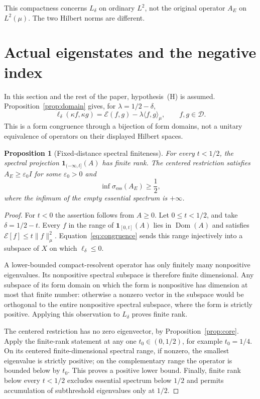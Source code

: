 \documentclass[11pt,a4paper]{article}
\numberwithin{equation}{section}
\newtheorem{proposition}[theorem]{Proposition}
\theoremstyle{definition}
\theoremstyle{remark}
\newcommand{\E}{\mathcal E}
\newcommand{\D}{\mathcal D}
\newcommand{\dom}{\operatorname{Dom}}
\newcommand{\ess}{\operatorname{ess}}
\newcommand{\ip}[2]{\langle #1,#2\rangle}
\newcommand{\norm}[1]{\lVert #1\rVert}
\newcommand{\one}{\mathbf 1}
\begin{document}
This compactness concerns $L_\delta$ on ordinary $L^2$, not the original operator $A_E$ on $L^2(\mu)$. The two Hilbert norms are different.

\section{Actual eigenstates and the negative index}\label{sec:spectrum}

In this section and the rest of the paper, hypothesis~\textup{(H)} is assumed. Proposition~\ref{prop:domain} gives, for $\lambda=1/2-\delta$,
\begin{equation}\label{eq:congruence}
 \ell_\delta(\kappa f,\kappa g)
       =\E(f,g)-\lambda\ip{f}{g}_\mu,
       \qquad f,g\in\D.
\end{equation}
This is a form congruence through a bijection of form domains, not a unitary equivalence of operators on their displayed Hilbert spaces.

\begin{proposition}[Fixed-distance spectral finiteness]\label{prop:finite}
For every $t<1/2$, the spectral projection $\one_{(-\infty,t]}(A)$ has finite rank. The centered restriction satisfies $A_E\ge\varepsilon_0 I$ for some $\varepsilon_0>0$ and
\begin{equation}\label{eq:essential}
 \inf\sigma_{\ess}(A_E)\ge\frac12,
\end{equation}
where the infimum of the empty essential spectrum is $+\infty$.
\end{proposition}
\begin{proof}
For $t<0$ the assertion follows from $A\ge0$. Let $0\le t<1/2$, and take $\delta=1/2-t$. Every $f$ in the range of $\one_{[0,t]}(A)$ lies in $\dom(A)$ and satisfies $\E[f]\le t\norm{f}_\mu^2$. Equation~\eqref{eq:congruence} sends this range injectively into a subspace of $X$ on which $\ell_\delta\le0$.

A lower-bounded compact-resolvent operator has only finitely many nonpositive eigenvalues. Its nonpositive spectral subspace is therefore finite dimensional. Any subspace of its form domain on which the form is nonpositive has dimension at most that finite number: otherwise a nonzero vector in the subspace would be orthogonal to the entire nonpositive spectral subspace, where the form is strictly positive. Applying this observation to $L_\delta$ proves finite rank.

The centered restriction has no zero eigenvector, by Proposition~\ref{prop:core}. Apply the finite-rank statement at any one $t_0\in(0,1/2)$, for example $t_0=1/4$. On its centered finite-dimensional spectral range, if nonzero, the smallest eigenvalue is strictly positive; on the complementary range the operator is bounded below by $t_0$. This proves a positive lower bound. Finally, finite rank below every $t<1/2$ excludes essential spectrum below $1/2$ and permits accumulation of subthreshold eigenvalues only at $1/2$.
\end{proof}
\end{document}
